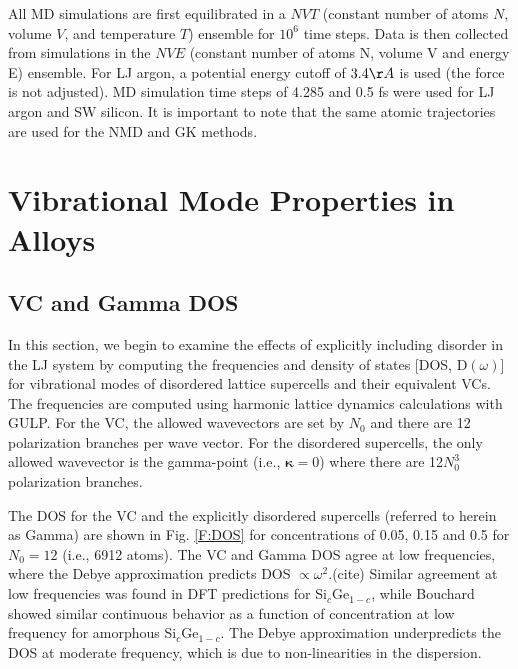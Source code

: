 \documentclass[aps,prb,onecolumn,preprint,superscriptaddress,amsmath,amssymb,floatfix]{revtex4}
\begin{document}
All MD simulations are first equilibrated in a $NVT$ (constant 
number of atoms $N$, volume $V$, and temperature $T$) ensemble for 
$10^6$ time steps. Data is then collected from simulations in the $NVE$ 
(constant number of 
atoms N, volume V and energy E) ensemble. For LJ argon, a potential 
energy cutoff of $3.4 \AA$ is used (the force is not adjusted). 
MD simulation time steps of 
4.285 and 0.5 fs were used for LJ argon and SW silicon. 
It is important to note that the same 
atomic trajectories are used for the NMD and GK methods. 

\section{\label{S:Vibrational}
Vibrational Mode Properties in Alloys}

\subsection{\label{S:VC Gamma DOS}VC and Gamma DOS}

In this section, we begin to examine the effects of explicitly including 
disorder in the LJ system by computing 
the frequencies and density of states [DOS, D$(\omega)$] 
for vibrational modes of disordered lattice supercells and their 
equivalent VCs. The frequencies 
are computed using harmonic lattice dynamics calculations with  
GULP.\cite{gale_general_2003} For the 
VC, the allowed wavevectors are set by $N_0$ and there are 12 
polarization branches per wave vector.\cite{larkin_comparison_2012} 
For the disordered 
supercells,
the only allowed wavevector is the gamma-point (i.e., $\pmb{\kappa}=0$) 
where there are 12$N_0^3$ polarization branches. 

The DOS for the VC and the explicitly disordered supercells 
(referred to herein as Gamma) are shown in Fig. \ref{F:DOS} 
for concentrations of 0.05, 0.15 and 0.5 for 
$N_0=12$ (i.e., 6912 atoms). The VC and Gamma DOS 
agree at low frequencies, where the Debye approximation predicts 
DOS $\propto \omega^2$.(cite) 
Similar agreement at low frequencies was found in DFT  
predictions 
for Si$_c$Ge$_{1-c}$,\cite{garg_role_2011} while Bouchard showed similar 
continuous behavior as a function of concentration at low frequency for 
amorphous Si$_c$Ge$_{1-c}$.\cite{bouchard_vibrational_1988} 
The Debye approximation 
underpredicts the DOS at moderate frequency, which is due to 
non-linearities in the dispersion.\cite{ashcroft_solid_1976}
\end{document}
